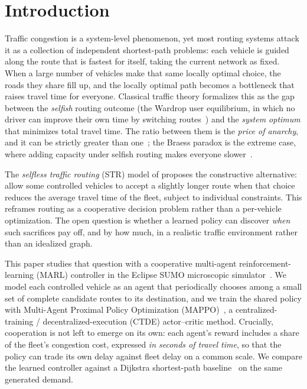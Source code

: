 \section{Introduction}
Traffic congestion is a system-level phenomenon, yet most routing systems attack it as
a collection of independent shortest-path problems: each vehicle is guided along the
route that is fastest for itself, taking the current network as fixed. When a large
number of vehicles make that same locally optimal choice, the roads they share fill up,
and the locally optimal path becomes a bottleneck that raises travel time for everyone.
Classical traffic theory formalizes this as the gap between the \emph{selfish} routing
outcome (the Wardrop user equilibrium, in which no driver can improve their own time by
switching routes~\citep{wardrop1952}) and the \emph{system optimum} that minimizes total
travel time. The ratio between them is the \emph{price of anarchy}, and it can be
strictly greater than one~\citep{roughgarden2002selfish}; the Braess paradox is the
extreme case, where adding capacity under selfish routing makes everyone slower~\citep{braess2005paradox}.

The \emph{selfless traffic routing} (STR) model of \citet{dai2019str} proposes
the constructive alternative: allow some controlled vehicles to accept a slightly longer
route when that choice reduces the average travel time of the fleet, subject to
individual constraints. This reframes routing as a cooperative decision problem rather
than a per-vehicle optimization. The open question is whether a learned policy can
discover \emph{when} such sacrifices pay off, and by how much, in a realistic traffic
environment rather than an idealized graph.

This paper studies that question with a cooperative multi-agent reinforcement-learning
(MARL) controller in the Eclipse SUMO microscopic simulator~\citep{lopez2018sumo}. We model
each controlled vehicle as an agent that periodically chooses among a small set of complete
candidate routes to its destination, and we train the shared policy with Multi-Agent
Proximal Policy Optimization (MAPPO)~\citep{yu2022mappo}, a centralized-training /
decentralized-execution (CTDE) actor--critic method. Crucially, cooperation is not left to
emerge on its own: each agent's reward includes a share of the fleet's congestion cost,
expressed \emph{in seconds of travel time}, so that the policy can trade its own delay
against fleet delay on a common scale. We compare the learned controller against a Dijkstra
shortest-path baseline~\citep{dijkstra1959note} on the same generated demand.


